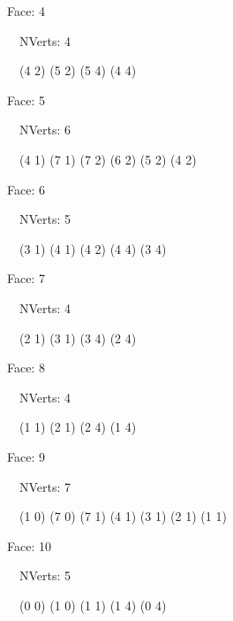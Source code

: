 \documentclass{article}
\begin{document}
    {\footnotesize

    Face: 4

    \   \    NVerts: 4

     \   \   (4 2) (5 2) (5 4) (4 4)}

    {\footnotesize

    Face: 5

    \   \    NVerts: 6

     \   \   (4 1) (7 1) (7 2) (6 2) (5 2) (4 2)}

    {\footnotesize

    Face: 6

    \   \    NVerts: 5

     \   \   (3 1) (4 1) (4 2) (4 4) (3 4)}

    {\footnotesize

    Face: 7

    \   \    NVerts: 4

     \   \   (2 1) (3 1) (3 4) (2 4)}

    {\footnotesize

    Face: 8

    \   \    NVerts: 4

     \   \   (1 1) (2 1) (2 4) (1 4)}

    {\footnotesize

    Face: 9

    \   \    NVerts: 7

     \   \   (1 0) (7 0) (7 1) (4 1) (3 1) (2 1) (1 1)}

    {\footnotesize

    Face: 10

    \   \    NVerts: 5

     \   \   (0 0) (1 0) (1 1) (1 4) (0 4)}


     \newpage
\end{document}
